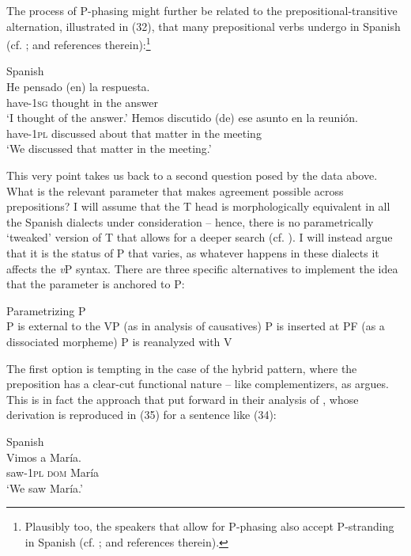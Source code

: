\documentclass[output=paper]{langsci/langscibook}
\begin{document}
The process of P-phasing might further be related to the prepositional-transitive alternation, illustrated in (32), that many prepositional verbs undergo in Spanish (cf. \citealt{Demonte1991,García-Miguel1995,Gallego2010}; and references therein):\footnote{Plausibly too, the speakers that allow for P-phasing also accept P-stranding in Spanish (cf. \citealt{Depiante2013,Lemos2013}; and references therein).}

\ea%
    Spanish\label{ex:gallego:32}\\
    \ea
    \gll He             pensado (en) la     respuesta.        \\
         have{}-\textsc{1sg}  thought    in   the   answer\\
    \glt ‘I thought of the answer.’
    \ex
    \gll Hemos      discutido  (de)     ese  asunto  en  la   reunión.  \\
         have{}-\textsc{1pl}  discussed  about  that  matter  in  the meeting\\
    \glt ‘We discussed that matter in the meeting.’
    \z
\z

This very point takes us back to a second question posed by the data above. What is the relevant parameter that makes agreement possible across prepositions? I will assume that the T head is morphologically equivalent in all the Spanish dialects under consideration – hence, there is no parametrically ‘tweaked’ version of T that allows for a deeper search (cf. \citealt{Chomsky2001Derivation}). I will instead argue that it is the status of P that varies, as whatever happens in these dialects it affects the \textit{v}P syntax. There are three specific alternatives to implement the idea that the parameter is anchored to P:

\ea%
    Parametrizing P\label{ex:gallego:33}\\
    \ea P is external to the VP (as in  analysis of causatives)
    \ex P is inserted at PF (as a dissociated morpheme)
    \ex P is reanalyzed with V
\z
\z

The first option is tempting in the case of the hybrid pattern, where the preposition has a clear-cut functional nature – like complementizers, as \citet{Kayne2004} argues. This is in fact the approach that \citet{Ordóñez2017} put forward in their analysis of \DOM, whose derivation is reproduced in (35) for a sentence like (34):

\ea%
    Spanish\label{ex:gallego:34}\\
    \gll   Vimos     a          María.\\
           saw{}-\textsc{1pl}  \textsc{dom}   María\\
    \glt   ‘We saw María.’
\z
  
\end{document}
